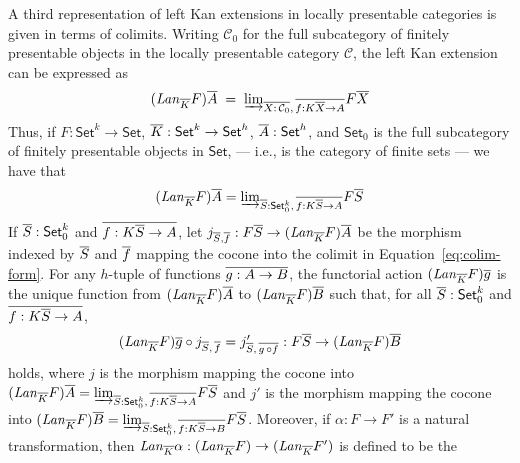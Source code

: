 \documentclass{lmcs}
\theoremstyle{plain}\newtheorem{satz}[thm]{Satz}
\newcommand{\set}{\mathsf{Set}}
\begin{document}
{A third representation of left Kan extensions in locally presentable
categories is given in terms of colimits. Writing ${\mathcal C}_0$ for
the full subcategory of finitely presentable objects in the locally
presentable category $\mathcal C$, the left Kan extension can be
expressed as
\[
(\mathit{Lan}_{\overline{K}} F)\overline{A} \;=\; {{\underrightarrow{\lim}}_{\overline{X : \,{\mathcal
        C}_0},\, \overline{f : K{\overline{X}} \to A}}{F \overline{X}}}\]
Thus, if $F : \set^k \to \set$, $\ol{K} :
  \set^k \to \set^h$, $\ol{A} : \set^h$, and $\set_0$ is the full
  subcategory of finitely presentable objects in $\set$, --- i.e., is
  the category of finite sets --- we  have that
\begin{equation}\label{eq:colim-form}
(\mathit{Lan}_{\ol K} F) \ol{A} = \colim{\ol{S} : \set_0^k, \,\ol{f :
      K\ol{S} \to  A}}{F \ol{S}}
\end{equation}
If $\ol{S} : \set_0^k$ and $\overline{f : K\overline{S} \to A}$, let $j_{\overline{S},
  \overline{f}} : F \overline{S} \to (\mathit{Lan}_{\overline{K}} F) \overline{A}$ be the morphism
indexed by $\overline{S}$ and $\overline{f}$ mapping the cocone into the colimit
in Equation~\ref{eq:colim-form}.
For any $h$-tuple of functions
$\overline{g : A \to B}$, the functorial action $(\mathit{Lan}_{\overline{K}
  }F) \overline{g}$
is the unique function from $(\mathit{Lan}_{\overline{K}} F) \overline{A}$ to
$(\mathit{Lan}_{\overline{K}} F) \overline{B}$ such that, for all $\ol{S} : \set^k_0$ and
$\overline{f : K\overline{S} \to A}$,\,
\begin{equation}\label{eq:cocone-def}
(\mathit{Lan}_{\overline{K}}F) \overline{g} \circ j_{\overline{S},\, \overline{f}}
= j'_{\overline{S},\, \overline{g\, \circ f}}
: F \overline{S} \to (\mathit{Lan}_{\overline{K}}F) \overline{B}
\end{equation}
holds, where $j$ is the morphism mapping the cocone into
$(\mathit{Lan}_{\ol K} F) \ol{A} = \colim{\ol{S} : \set_0^k, \,\ol{f :
    K\ol{S} \to A}}{F \ol{S}}$ and $j'$ is the morphism mapping the
cocone into $(\mathit{Lan}_{\ol K} F) \ol{B} = \colim{\ol{S} : \set_0^k,
  \,\ol{f : K\ol{S} \to B}}{F \ol{S}}$.  Moreover, if $\alpha : F \to
F'$ is a natural transformation, then $\mathit{Lan}_{\overline{K}} \alpha :
(\mathit{Lan}_{\overline{K}} F) \to (\mathit{Lan}_{\overline{K}} F')$ is defined to be the
}
\end{document}
